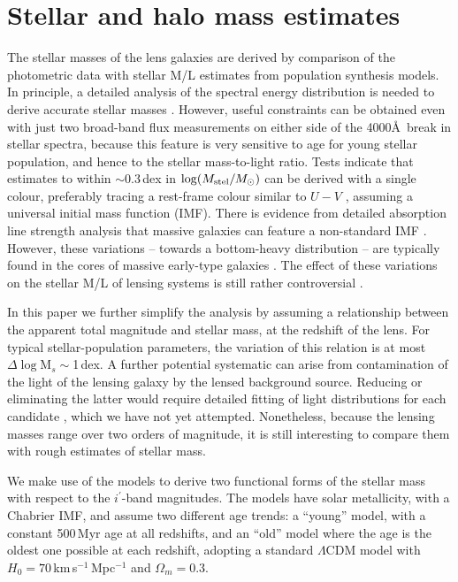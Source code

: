 
\section{Stellar and halo mass estimates}
\label{sec:stellar-mass}

The stellar masses of the lens galaxies are derived by comparison of
the photometric data with stellar M/L estimates from population
synthesis models.  In principle, a detailed analysis of the spectral
energy distribution is needed to derive accurate stellar masses
\citep[e.g.][]{2009ApJS..185..253G,2011MNRAS.418.1587T}.
However, useful constraints can be obtained even with just two
broad-band flux measurements on either side of the
4000\thinspace\AA~break in stellar spectra, because this feature is
very sensitive to age for young stellar population, and hence to the
stellar mass-to-light ratio.  Tests indicate that
estimates to within $\sim$0.3\,dex in $\log(M_\text{stel}/M_\odot)$ can be derived
with a single colour, preferably tracing a rest-frame colour similar
to $U-V$ \citep[see Fig.~1 of][]{2008MNRAS.383..857F}, assuming
a universal initial mass function (IMF). There is
evidence from detailed absorption line strength analysis that massive
galaxies can feature a non-standard IMF 
\citep[e.g.][]{2013MNRAS.429L..15F}. However, these variations --
towards a bottom-heavy distribution -- are typically found in the
cores of massive early-type galaxies \citep{2016MNRAS.457.1468L}. The
effect of these variations on the stellar M/L of lensing systems is
still rather controversial
\citep{2015MNRAS.449.3441S,2016MNRAS.459.3677L}.

In this paper we further simplify the analysis by assuming a
relationship between the apparent total magnitude and stellar mass, at
the redshift of the lens.  For typical stellar-population parameters,
the variation of this relation is at most $\Delta\log$M$_s\sim$1\,dex.
A further potential systematic can arise from contamination of the
light of the lensing galaxy by the lensed background source.  Reducing
or eliminating the latter would require detailed fitting of light
distributions for each candidate \citep[see][]{2011ApJ...740...97L},
which we have not yet attempted.  Nonetheless, because the lensing
masses range over two orders of magnitude, it is still interesting to
compare them with rough estimates of stellar mass.

We make use of the \citet{2003MNRAS.344.1000B} models to derive two
functional forms of the stellar mass with respect to the $i^{\prime}$-band
magnitudes. The models have solar metallicity, with a Chabrier IMF,
and assume two different age trends: a ``young'' model, with a
constant 500\,Myr age at all redshifts, and an ``old'' model where the
age is the oldest one possible at each redshift, adopting a standard
$\Lambda$CDM model with $H_0=70$\,km\,s$^{-1}$\,Mpc$^{-1}$ and
$\Omega_m=0.3$.

